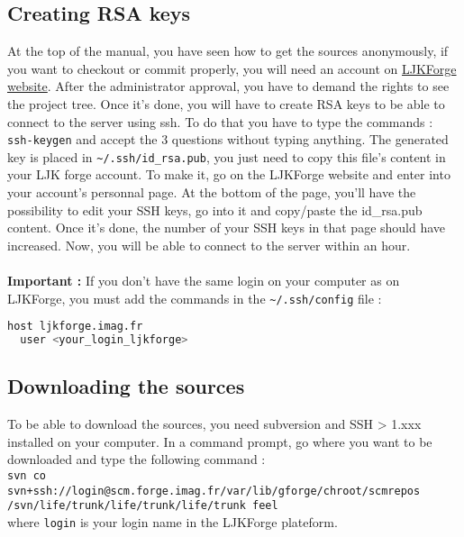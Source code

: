 \subsection{Creating RSA keys}
\label{sec:creation-rsa-keys}
At the top of the manual, you have seen how to get the sources anonymously, if you want to checkout or commit properly, you will need an account on \href{https://forge.imag.fr/}{LJKForge website}. After the administrator approval, you have to demand the rights to see the project tree. \newline \newline
Once it's done, you will have to create RSA keys to be able to connect to the server using ssh. To do that you have to type the commands : \verb|ssh-keygen| and accept the 3 questions without typing anything. The generated key is placed in \verb|~/.ssh/id_rsa.pub|, you just need to copy this file's content in your LJK forge account. To make it, go on the LJKForge website and enter into your account's personnal page. At the bottom of the page, you'll have the possibility to edit your SSH keys, go into it and copy/paste the id\_rsa.pub content. Once it's done, the number of your SSH keys in that page should have increased. Now, you will be able to connect to the server within an hour.
\\ \\
{\bfseries Important : } If you don't have the same login on your computer as on
LJKForge, you must add the commands in the \verb|~/.ssh/config| file :
\begin{lstlisting}[language=sh]
host ljkforge.imag.fr
  user <your_login_ljkforge>
\end{lstlisting}


\subsection{Downloading the sources}
\label{sec:download-sources}

To be able to download the \feel sources, you need subversion and SSH > 1.xxx
installed on your computer. In a command prompt, go where you want \feel to be
downloaded and type the following command :
\\ \verb|svn co svn+ssh://login@scm.forge.imag.fr/var/lib/gforge/chroot/scmrepos|
\\ \verb|/svn/life/trunk/life/trunk/life/trunk feel|
\\ where \verb|login| is your login name in the LJKForge plateform. 

